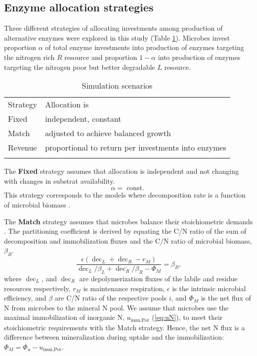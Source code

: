 \subsection{ Enzyme allocation strategies 
\label{sec:AllocStrategies}}

Three different strategies of allocating investments among production of
alternative enzymes were explored in this study (Table
\ref{tab:AllocStrategies}). Microbes invest proportion $\alpha$ of total enzyme
investments into production of enzymes targeting the nitrogen rich $R$ resource
and proportion $1 - \alpha$ into production of enzymes targeting the nitrogen
poor but better degradable $L$ resource.

\begin{table}[t]
\caption{Simulation scenarios \label{tab:AllocStrategies}}
\vskip4mm
\centering
\begin{tabular}{ll}
\tophline
Strategy &  Allocation is \\
\middlehline
Fixed & independent, constant \\
Match & adjusted to achieve balanced growth \\
Revenue & proportional to return per investments into enzymes \\
\bottomhline
\end{tabular}
\end{table}


The \textbf{Fixed} strategy assumes that allocation is independent
and not changing with changes in substrat availability.
\begin{equation} 
\label{eq:allocFixed}
\alpha = \operatorname{const.}
\end{equation}
This strategy corresponds to the models where decomposition rate is a function
of microbial biomass \citep{Wutzler08}.
 
The \textbf{Match} strategy assumes that microbes balance their stoichiometric
demands \citep{Moorhead12}. The partitioning coefficient is derived by equating
the C/N ratio of the sum of decomposition and immobilization fluxes and the C/N
ratio of microbial biomass, $\beta_B$. 
\begin{equation} 
\label{eq:allocMatchCN}
\frac{\epsilon (\operatorname{dec}_L + \operatorname{dec}_R - r_M)}{
\operatorname{dec}_L/\beta_L + \operatorname{dec}_R/\beta_R  - \Phi_M } =
\beta_B
\text{,}
\end{equation}
where $\operatorname{dec}_L$, and $\operatorname{dec}_R$ are 
depolymerization fluxes of the labile and residue resources
respectively, $r_M$ is maintenance respiration, $\epsilon$ is the 
intrinsic microbial efficiency, and $\beta$ are C/N ratio of
the respective pools $i$, and $\Phi_M$ is the net flux of N from microbes to the
mineral N pool.
We assume that microbes use the maximal immobilization of inorganic N,
$u_{\operatorname{imm,Pot}}$ (\ref{eq:uN}), to meet their stoichiometric
requirements with the Match strategy. 
Hence, the net N flux is a difference between mineralization during uptake and the
immobilization: $\Phi_M = \Phi_u - u_{\operatorname{imm,Pot}}$.

